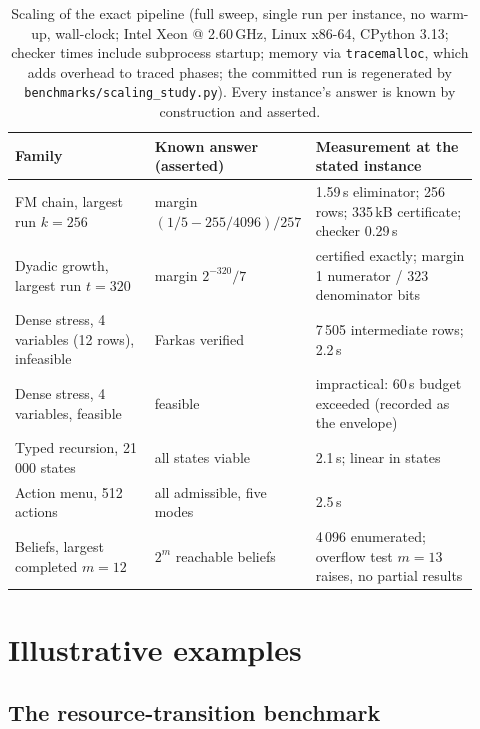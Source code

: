 \documentclass[3p,11pt]{elsarticle}
\begin{document}
\begin{table}[t]
\centering\footnotesize
\setlength{\tabcolsep}{3pt}
\begin{tabular}{@{}p{0.30\linewidth}p{0.27\linewidth}p{0.35\linewidth}@{}}
\toprule
Family & Known answer (asserted) & Measurement at the stated instance \\
\midrule
FM chain, largest run $k = 256$ & margin $(1/5 - 255/4096)/257$ &
1.59\,s eliminator; 256 rows; 335\,kB certificate; checker 0.29\,s \\
Dyadic growth, largest run $t = 320$ & margin $2^{-320}/7$ & certified
exactly; margin 1 numerator / 323 denominator bits \\
Dense stress, 4 variables (12 rows), infeasible & Farkas verified &
7\,505 intermediate rows; 2.2\,s \\
Dense stress, 4 variables, feasible & feasible & impractical: 60\,s
budget exceeded (recorded as the envelope) \\
Typed recursion, 21\,000 states & all states viable & 2.1\,s; linear in
states \\
Action menu, 512 actions & all admissible, five modes & 2.5\,s \\
Beliefs, largest completed $m = 12$ & $2^{m}$ reachable beliefs &
4\,096 enumerated; overflow test $m = 13$ raises, no partial results \\
\bottomrule
\end{tabular}
\caption{Scaling of the exact pipeline (full sweep, single run per
instance, no warm-up, wall-clock; Intel Xeon @ 2.60\,GHz, Linux x86-64,
CPython 3.13; checker times include subprocess startup; memory via
\texttt{tracemalloc}, which adds overhead to traced phases; the committed
run is regenerated by \texttt{benchmarks/scaling\_study.py}). Every
instance's answer is known by construction and asserted.}
\label{tab:scaling}
\end{table}

\section{Illustrative examples}\label{sec:examples}

\subsection{The resource-transition benchmark}\label{sec:benchmark}
\end{document}
